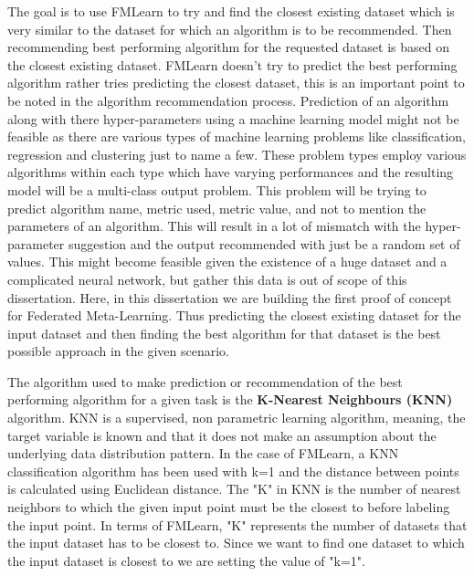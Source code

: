 The goal is to use FMLearn to try and find the closest existing dataset which is very similar to the dataset for which an algorithm is to be recommended. Then recommending best performing algorithm for the requested dataset is based on the closest existing dataset. FMLearn doesn't try to predict the best performing algorithm rather tries predicting the closest dataset, this is an important point to be noted in the algorithm recommendation process. Prediction of an algorithm along with there hyper-parameters using a machine learning model might not be feasible as there are various types of machine learning problems like classification, regression and clustering just to name a few. These problem types employ various algorithms within each type which have varying performances and the resulting model will be a multi-class output problem. This problem will be trying to predict algorithm name, metric used, metric value, and not to mention the parameters of an algorithm. This will result in a lot of mismatch with the hyper-parameter suggestion and the output recommended with just be a random set of values. This might become feasible given the existence of a huge dataset and a complicated neural network, but gather this data is out of scope of this dissertation. Here, in this dissertation we are building the first proof of concept for Federated Meta-Learning. Thus predicting the closest existing dataset for the input dataset and then finding the best algorithm for that dataset is the best possible approach in the given scenario.

The algorithm used to make prediction or recommendation of the best performing algorithm for a given task is the \textbf{K-Nearest Neighbours (KNN)} algorithm. KNN is a supervised, non parametric learning algorithm, meaning, the target variable is known and that it does not make an assumption about the underlying data distribution pattern. In the case of FMLearn, a KNN classification algorithm has been used with k=1 and the distance between points is calculated using Euclidean distance. The "K" in KNN is the number of nearest neighbors to which the given input point must be the closest to before labeling the input point. In terms of FMLearn, "K" represents the number of datasets that the input dataset has to be closest to. Since we want to find one dataset to which the input dataset is closest to we are setting the value of "k=1". 

